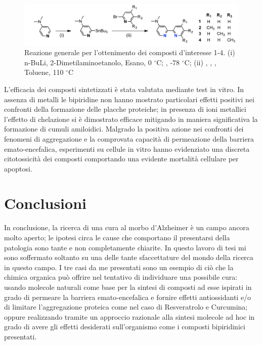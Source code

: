 \documentclass[a4paper, 11pt]{article}
\begin{document}
\begin{figure}[H]
	\centering
	\includegraphics[width=.8\linewidth]{immagini/rea_g.png}
	\caption{Reazione generale per l'ottenimento dei composti d'interesse 1-4. (i) n-BuLi, 2-Dimetilaminoetanolo, Esano, 0 $^\circ$C; , -78 $^\circ$C; (ii) , , , Toluene, 110 $^\circ$C }
	\label{fig:rea_g}
\end{figure}

L'efficacia dei composti sintetizzati è stata valutata mediante test in vitro. In assenza di metalli le bipiridine non hanno mostrato particolari effetti positivi nei confronti della formazione delle placche proteiche; in presenza di ioni metallici l'effetto di chelazione si è dimostrato efficace mitigando in maniera significativa la formazione di cumuli amiloidici. Malgrado la positiva azione nei confronti dei fenomeni di aggregazione e la comprovata capacità di permeazione della barriera emato-encefalica, esperimenti su cellule in vitro hanno evidenziato una discreta citotossicità dei composti comportando una evidente mortalità cellulare per apoptosi. \cite{ji_strategic_2017}

\section{Conclusioni}
In conclusione, la ricerca di una cura al morbo d'Alzheimer è un campo ancora molto aperto; le ipotesi circa le cause che comportano il presentarsi della patologia sono tante e non completamente chiarite. In questo lavoro di tesi mi sono soffermato soltanto su una delle tante sfaccettature del mondo della ricerca in questo campo. I tre casi da me presentati sono un esempio di ciò che la chimica organica può offrire nel tentativo di individuare una possibile cura: usando molecole naturali come base per la sintesi di composti ad esse ispirati in grado di permeare la barriera emato-encefalica e fornire effetti antiossidanti e/o di limitare l'aggregazione proteica come nel caso di Resveratrolo e Curcumina; oppure realizzando tramite un approccio razionale alla sintesi molecole ad hoc in grado di avere gli effetti desiderati sull'organismo come i composti bipiridinici presentati.




\printbibliography
\end{document}
